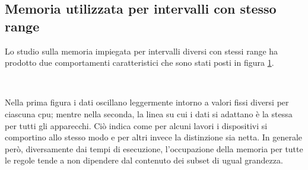 \subsection{Memoria utilizzata per intervalli con stesso range}
Lo studio sulla memoria impiegata per intervalli diversi con stessi range ha prodotto due comportamenti caratteristici che sono stati posti in figura \ref{fig:RSSrng}.
\begin{figure}[H]
\centering
{} \quad
{} \\
\caption{}
\label{fig:RSSrng}
\end{figure}

Nella prima figura i dati oscillano leggermente intorno a valori fissi diversi per ciascuna cpu; mentre nella seconda, la linea su cui i dati si adattano è la stessa per tutti gli apparecchi.
Ciò indica come per alcuni lavori i dispositivi si comportino allo stesso modo e per altri invece la distinzione sia netta. 
In generale però, diversamente dai tempi di esecuzione, l'occupazione della memoria per tutte le regole tende a non dipendere dal contenuto dei subset di ugual grandezza.



